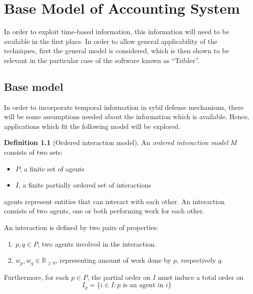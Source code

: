 \documentclass[a4paper,11pt]{book}
\newcommand{\bb}{\mathbb}
\theoremstyle{definition}
\newtheorem{definition}{Definition}
\begin{document}
\chapter{Base Model of Accounting System}

In order to exploit time-based information, this information will need to be
available in the first place. In order to allow general applicability of the
techniques, first the general model is considered, which is then shown to be
relevant in the particular case of the software known as ``Tribler''.


\section{Base model}

In order to incorporate temporal information in sybil defense mechanisms,
there will be some assumptions needed about the information which is available.
Hence, applications which fit the following model will be explored.

\begin{definition}[Ordered interaction model]
    An \emph{ordered interaction model} $M$ consists of two sets:  
    
    \begin{itemize}
        \item $P$, a finite set of agents
        \item $I$, a finite partially ordered set of interactions
    \end{itemize}

    agents represent entities that can interact with each other.
    An interaction consists of two agents, one or both performing
    work for each other. 
    
    An interaction is defined by two pairs of properties:
    \begin{enumerate}
        \item $p, q \in P$, two agents involved in the interaction.
        \item $w_p, w_q \in \bb{R}_{\geq0}$, representing amount of work done by $p$, respectively $q$.
    \end{enumerate}

    Furthermore, for each $p \in P$, the partial order on $I$ must induce a total order on 
    \begin{equation*}
        I_p = \{i \in I : p \mbox{ is an agent in } i\}
    \end{equation*}
\end{definition}
\end{document}
